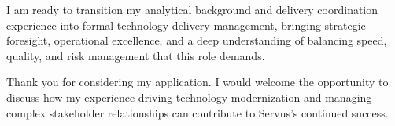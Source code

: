 \begin{storedcvletter}
{I am ready to transition my analytical background and delivery coordination experience into formal technology delivery management, bringing strategic foresight, operational excellence, and a deep understanding of balancing speed, quality, and risk management that this role demands.

Thank you for considering my application. I would welcome the opportunity to discuss how my experience driving technology modernization and managing complex stakeholder relationships can contribute to Servus's continued success.
}
\end{storedcvletter}

